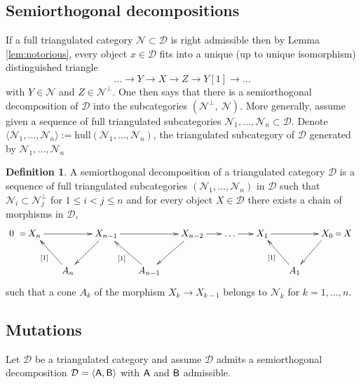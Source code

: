 \documentclass[sn-mathphys-num]{sn-jnl}%
\newcommand{\N}{\mathcal N}
\newcommand{\D}{\mathcal D}
\newcommand{\subsetq}{\subset}
\newcommand{\hull}{{\mathrm{hull}}}
\newcommand{\A}{{\sf A}}
\newcommand{\B}{{\sf B}}
\theoremstyle{definition}
\newtheorem{definition}[theorem]{Definition}%
\begin{document}
\subsection{Semiorthogonal decompositions}\label{subsec:sod}


If a full triangulated category $\N\subset \D$ is right admissible then by Lemma \ref{lem:notorious}, every object $x\in \D$ fits into a unique 
(up to unique isomorphism) distinguished triangle
\begin{equation}
\dots \longrightarrow  Y\longrightarrow X\longrightarrow Z\longrightarrow Y[1]\rightarrow \dots
\end{equation}
with $Y\in \N$ and $Z\in \N^{\perp}$. One then
says that there is a semiorthogonal decomposition of $\D$ into
the subcategories $(\N^{\perp}, \ \N)$. More generally,
assume given a sequence of full triangulated subcategories $\N _1,\dots,\N_n \subset \D$. Denote $\langle \N _1,\dots,\N _n\rangle:= \hull (\N _1,\dots,\N _n)$, the triangulated subcategory of $\D$ generated by $\N _1,\dots,\N _n$


\begin{definition}\label{def:semdecomposition-filtration}
{A semiorthogonal decomposition of a triangulated category $\D$ is a sequence of full triangulated subcategories $( \N _1,\dots,\N _n)$ in $\D$ such that $\N _i\subsetq \N_j^{\perp}$ for $1\leq i < j\leq n$ and for every object $X\in \D$ there exists a chain of morphisms in $\D$,
\[
\xymatrix@C=.5em{
0_{\ } \ar@{=}[r] & X_n \ar[rrrr] &&&& X_{n-1} \ar[rrrr] \ar[dll] &&&& X_{n-2}
\ar[rr] \ar[dll] && \ldots \ar[rr] && X_{1}
\ar[rrrr] &&&& X_0 \ar[dll] \ar@{=}[r] &  X_{\ } \\
&&& A_{n} \ar@{->}^{[1]}[ull] &&&& A_{n-1} \ar@{->}^{[1]}[ull] &&&&&&&& A_1\ar@{->}^{[1]}[ull] 
}
\]
such that a cone $A_k$ of the morphism $X_k\rightarrow X_{k-1}$ belongs to $\N _k$ for $k=1,\dots ,n$.}
\end{definition}

\subsection{Mutations}\label{subsec:mutations}

Let $\D$ be a triangulated category and assume $\D$ admits a semiorthogonal decomposition 
$\D = \langle \A, \B \rangle$ with $\A$ and $\B$ admissible.
\end{document}
